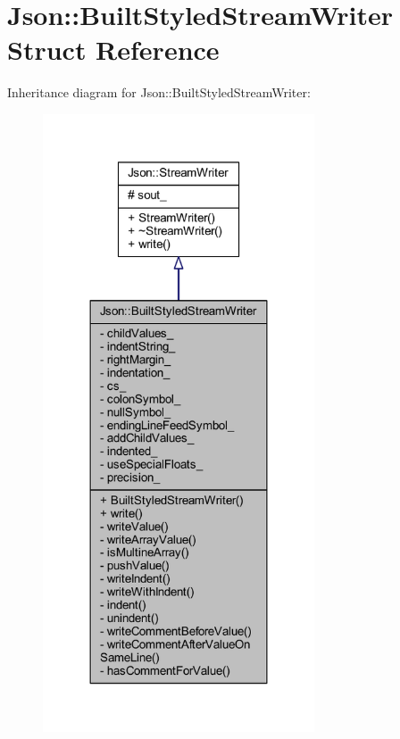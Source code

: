 \hypertarget{struct_json_1_1_built_styled_stream_writer}{}\section{Json\+:\+:Built\+Styled\+Stream\+Writer Struct Reference}
\label{struct_json_1_1_built_styled_stream_writer}


Inheritance diagram for Json\+:\+:Built\+Styled\+Stream\+Writer\+:\nopagebreak
\begin{figure}[H]
\begin{center}
\leavevmode
\includegraphics[width=228pt]{struct_json_1_1_built_styled_stream_writer__inherit__graph}
\end{center}
\end{figure}



